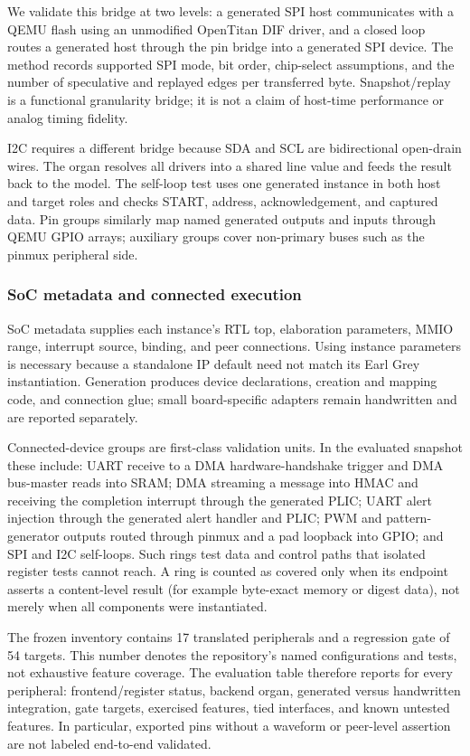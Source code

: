 We validate this bridge at two levels: a generated SPI host communicates with a
QEMU flash using an unmodified OpenTitan DIF driver, and a closed loop routes a
generated host through the pin bridge into a generated SPI device.  The method
records supported SPI mode, bit order, chip-select assumptions, and the number
of speculative and replayed edges per transferred byte.  Snapshot/replay is a
functional granularity bridge; it is not a claim of host-time performance or
analog timing fidelity.

I2C requires a different bridge because SDA and SCL are bidirectional open-drain
wires.  The organ resolves all drivers into a shared line value and feeds the
result back to the model.  The self-loop test uses one generated instance in both
host and target roles and checks START, address, acknowledgement, and captured
data.  Pin groups similarly map named generated outputs and inputs through QEMU
GPIO arrays; auxiliary groups cover non-primary buses such as the pinmux
peripheral side.

\subsubsection{SoC metadata and connected execution}

SoC metadata supplies each instance's RTL top, elaboration parameters, MMIO
range, interrupt source, binding, and peer connections.  Using instance
parameters is necessary because a standalone IP default need not match its
Earl Grey instantiation.  Generation produces device declarations, creation and
mapping code, and connection glue; small board-specific adapters remain
handwritten and are reported separately.

Connected-device groups are first-class validation units.  In the evaluated
snapshot these include: UART receive to a DMA hardware-handshake trigger and DMA
bus-master reads into SRAM; DMA streaming a message into HMAC and receiving the
completion interrupt through the generated PLIC; UART alert injection through
the generated alert handler and PLIC; PWM and pattern-generator outputs routed
through pinmux and a pad loopback into GPIO; and SPI and I2C self-loops.  Such
rings test data and control paths that isolated register tests cannot reach.  A
ring is counted as covered only when its endpoint asserts a content-level result
(for example byte-exact memory or digest data), not merely when all components
were instantiated.

The frozen inventory contains 17 translated peripherals and a regression gate
of 54 targets.  This number denotes the repository's named configurations and
tests, not exhaustive feature coverage.  The evaluation table therefore reports
for every peripheral: frontend/register status, backend organ, generated versus
handwritten integration, gate targets, exercised features, tied interfaces, and
known untested features.  In particular, exported pins without a waveform or
peer-level assertion are not labeled end-to-end validated.

